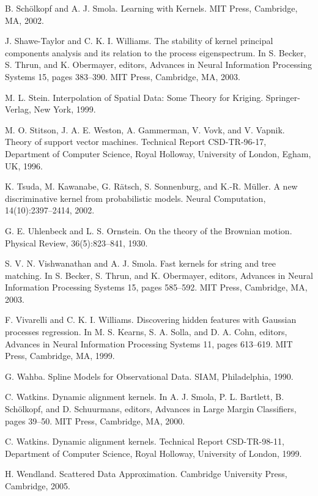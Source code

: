 \documentclass[11pt]{book}
\begin{document}
\begin{thebibliography}{99}
 B. Schölkopf and A. J. Smola. Learning with Kernels. MIT Press, Cambridge, MA, 2002.

 J. Shawe-Taylor and C. K. I. Williams. The stability of kernel principal components analysis and its relation to the process eigenspectrum. In S. Becker, S. Thrun, and K. Obermayer, editors, Advances in Neural Information Processing Systems 15, pages 383--390. MIT Press, Cambridge, MA, 2003.

 M. L. Stein. Interpolation of Spatial Data: Some Theory for Kriging. Springer-Verlag, New York, 1999.

 M. O. Stitson, J. A. E. Weston, A. Gammerman, V. Vovk, and V. Vapnik. Theory of support vector machines. Technical Report CSD-TR-96-17, Department of Computer Science, Royal Holloway, University of London, Egham, UK, 1996.

 K. Tsuda, M. Kawanabe, G. Rätsch, S. Sonnenburg, and K.-R. Müller. A new discriminative kernel from probabilistic models. Neural Computation, 14(10):2397--2414, 2002.

 G. E. Uhlenbeck and L. S. Ornstein. On the theory of the Brownian motion. Physical Review, 36(5):823--841, 1930.

 S. V. N. Vishwanathan and A. J. Smola. Fast kernels for string and tree matching. In S. Becker, S. Thrun, and K. Obermayer, editors, Advances in Neural Information Processing Systems 15, pages 585--592. MIT Press, Cambridge, MA, 2003.

 F. Vivarelli and C. K. I. Williams. Discovering hidden features with Gaussian processes regression. In M. S. Kearns, S. A. Solla, and D. A. Cohn, editors, Advances in Neural Information Processing Systems 11, pages 613--619. MIT Press, Cambridge, MA, 1999.

 G. Wahba. Spline Models for Observational Data. SIAM, Philadelphia, 1990.

 C. Watkins. Dynamic alignment kernels. In A. J. Smola, P. L. Bartlett, B. Schölkopf, and D. Schuurmans, editors, Advances in Large Margin Classifiers, pages 39--50. MIT Press, Cambridge, MA, 2000.

 C. Watkins. Dynamic alignment kernels. Technical Report CSD-TR-98-11, Department of Computer Science, Royal Holloway, University of London, 1999.

 H. Wendland. Scattered Data Approximation. Cambridge University Press, Cambridge, 2005.


\end{thebibliography}
\end{document}
